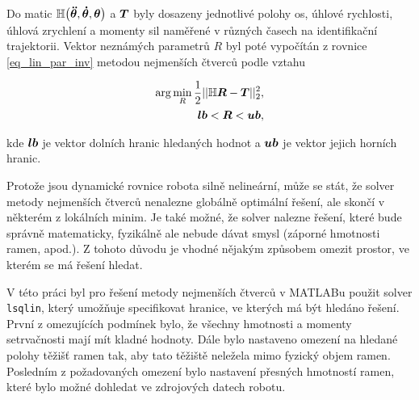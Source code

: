 
Do matic $\mathbb{H}\big(\boldsymbol{\ddot{\theta}},\boldsymbol{\dot{\theta}},\boldsymbol{\theta}\big)$ a $\boldsymbol{T}$ byly dosazeny jednotlivé polohy os, úhlové rychlosti, úhlová zrychlení a momenty sil naměřené v různých časech na identifikační trajektorii. Vektor neznámých parametrů $R$ byl poté vypočítán z rovnice \eqref{eq_lin_par_inv} metodou nejmenších čtverců podle vztahu

\begin{equation}
\begin{split}
\arg\min_{R} \frac{1}{2}\lvert|\mathbb{H}\boldsymbol{R}-\boldsymbol{T}\rvert|_2^2, \\
\boldsymbol{lb} < \boldsymbol{R} < \boldsymbol{ub},
\end{split}
\label{lsq}
\end{equation}

kde $\boldsymbol{lb}$ je vektor dolních hranic hledaných hodnot a $\boldsymbol{ub}$ je vektor jejich horních hranic.

Protože jsou dynamické rovnice robota silně nelineární, může se stát, že solver metody nejmenších čtverců nenalezne globálně optimální řešení, ale skončí v některém z lokálních minim. Je také možné, že solver nalezne řešení, které bude správně matematicky, fyzikálně ale nebude dávat smysl (záporné hmotnosti ramen, apod.). Z tohoto důvodu je vhodné nějakým způsobem omezit prostor, ve kterém se má řešení hledat.

V této práci byl pro řešení metody nejmenších čtverců v MATLABu použit solver \texttt{lsqlin}, který umožňuje specifikovat hranice, ve kterých má být hledáno řešení. První z omezujících podmínek bylo, že všechny hmotnosti a momenty setrvačnosti mají mít kladné hodnoty. Dále bylo nastaveno omezení na hledané polohy těžišť ramen tak, aby tato těžiště neležela mimo fyzický objem ramen. Posledním z požadovaných omezení bylo nastavení přesných hmotností ramen, které bylo možné dohledat ve zdrojových datech robotu.

